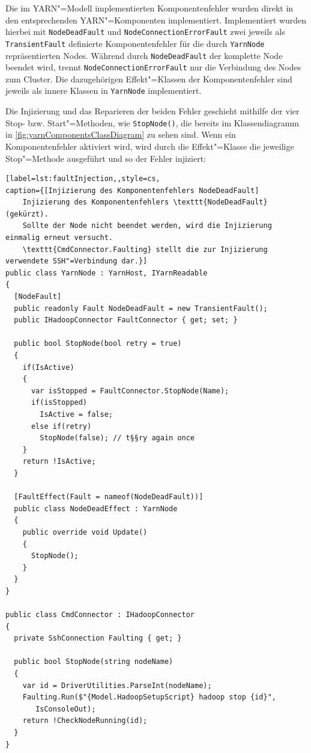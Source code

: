 Die im YARN"=Modell implementierten Komponentenfehler wurden direkt in den entsprechenden YARN"=Komponenten implementiert.
Implementiert wurden hierbei mit \texttt{NodeDeadFault} und \texttt{NodeConnectionErrorFault} zwei jeweils als \texttt{TransientFault} definierte Komponentenfehler für die durch \texttt{YarnNode} repräsentierten Nodes.
Während durch \texttt{NodeDeadFault} der komplette Node beendet wird, trennt \texttt{NodeConnectionErrorFault} nur die Verbindung des Nodes zum Cluster.
Die dazugehörigen Effekt"=Klassen der Komponentenfehler sind jeweils als innere Klassen in \texttt{YarnNode} implementiert.

Die Injizierung und das Reparieren der beiden Fehler geschieht mithilfe der vier Stop- bzw. Start"=Methoden, wie \zB \texttt{StopNode()}, die bereits im Klassendiagramm in \cref{fig:yarnComponentsClassDiagram} zu sehen sind.
Wenn ein Komponentenfehler aktiviert wird, wird durch die Effekt"=Klasse die jeweilige Stop"=Methode ausgeführt und so der Fehler injiziert:

\begin{lstlisting}[label=lst:faultInjection,,style=cs,
caption={[Injizierung des Komponentenfehlers NodeDeadFault]
    Injizierung des Komponentenfehlers \texttt{NodeDeadFault} (gekürzt).
    Sollte der Node nicht beendet werden, wird die Injizierung einmalig erneut versucht.
    \texttt{CmdConnector.Faulting} stellt die zur Injizierung verwendete SSH"=Verbindung dar.}]
public class YarnNode : YarnHost, IYarnReadable
{
  [NodeFault]
  public readonly Fault NodeDeadFault = new TransientFault();
  public IHadoopConnector FaultConnector { get; set; }
  
  public bool StopNode(bool retry = true)
  {
    if(IsActive)
    {
      var isStopped = FaultConnector.StopNode(Name);
      if(isStopped)
        IsActive = false;
      else if(retry)
        StopNode(false); // t§§ry again once
    }
    return !IsActive;
  }
  
  [FaultEffect(Fault = nameof(NodeDeadFault))]
  public class NodeDeadEffect : YarnNode
  {
    public override void Update()
    {
      StopNode();
    }
  }
}

public class CmdConnector : IHadoopConnector
{
  private SshConnection Faulting { get; }
  
  public bool StopNode(string nodeName)
  {
    var id = DriverUtilities.ParseInt(nodeName);
    Faulting.Run($"{Model.HadoopSetupScript} hadoop stop {id}",
       IsConsoleOut);
    return !CheckNodeRunning(id);
  }
}
\end{lstlisting}

